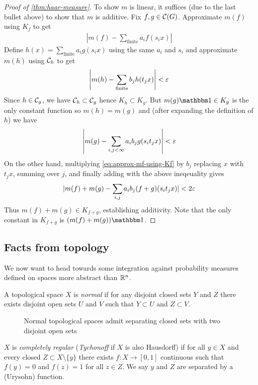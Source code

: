 \begin{proof}[Proof of \cref{thm:haar-measure}]
  To show $m$ is linear, it suffices (due to the last bullet above) to show
  that $m$ is additive. Fix $f,g \in \mathcal{C}(G)$. Approximate $m(f)$
  using $K_f$ to get
  \begin{align}
    \label{eq:approx-mf-using-Kf}
    \left\lvert m(f) - \sum_{\mathrm{finite}} a_i f(s_i x) \right\rvert
  \end{align}
  Define $h(x) = \sum_{\mathrm{finite}} a_i g(s_i x)$ using the same $a_i$
  and $s_i$ and approximate $m(h)$ using $\mathcal{C}_h$ to get
  \[
    \left\lvert m(h) - \sum_{\mathrm{finite}} b_j h(t_j x) \right\rvert < \varepsilon
  \]
  Since $h \in \mathcal{C}_g$, we have $\mathcal{C}_h
  \subset \mathcal{C}_g$ hence $K_h \subset K_g$. But $m(g) \ind \in K_g$ is the only
  constant function so $m(h) = m(g)$ and (after expanding the definition of $h$)
  we have
  \[
    \left\lvert m(g) - \sum_{i,j < \infty} a_i b_j g(s_i t_j x) \right\rvert < \varepsilon
  \]
  On the other hand, multiplying \cref{eq:approx-mf-using-Kf} by $b_j$
  replacing $x$ with $t_j x$, summing over $j$, and finally adding with
  the above ineqeuality gives
  \[
    \lvert m(f) + m(g) - \sum_{i,j} a_i b_j (f + g) (s_i t_j x) \rvert < 2 \varepsilon
  \]
  Thus $m(f) + m(g) \in K_{f+g}$, establishing additivity.
  Note that the only constant in $K_{f+g}$ is $(m(f) + m(g))\ind$.
\end{proof}

\subsection{Facts from topology}

We now want to head towards some integration against probability measures
defined on spaces more abstract than $\mathbb{R}^n$.


\begin{definition}
  A topological space $X$ is \emph{normal} if for any disjoint closed
  sets $Y$ and $Z$ there exists disjoint open sets $U$ and $V$
  such that $Y \subset U$ and $Z \subset V$.

\end{definition}

\begin{figure}[ht]
  \centering
  \caption{Normal topological spaces admit separating closed
  sets with two disjoint open sets}
  \label{fig:normal-topological-space}
\end{figure}

\begin{definition}
  $X$ is \emph{completely regular} (\emph{Tychonoff} if $X$ is also Hausdorff)
  if for all $y \in X$ and every closed $Z \subset X \setminus \{y\}$ there
  exists $f : X \to [0,1]$ continuous such that $f(y) = 0$ and $f(z) = 1$ for
  all $z \in Z$.
  We say $y$ and $Z$ are separated by a (Urysohn) function.
\end{definition}

